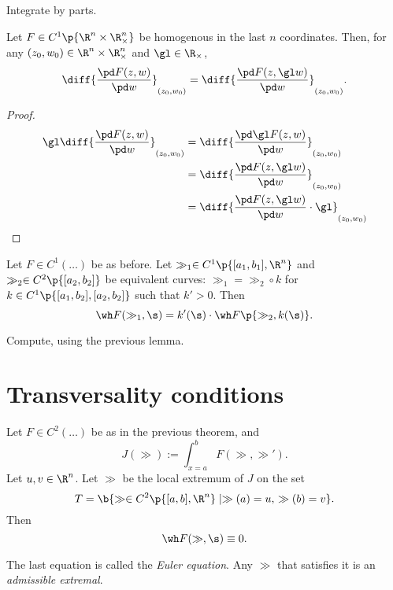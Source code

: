 \begin{idea}
  Integrate by parts.
\end{idea}

\begin{lemma}
  Let $F \in C^1 \p{\R^n \times \R^n_\times}$ be homogenous in the last $n$ coordinates.
  Then, for any $(z_0, w_0) \in \R^n \times \R^n_\times$ and $\gl \in \R_\times$,
  \begin{align*}
    \diff{\frac{\pd F(z, w)}{\pd w}}_{(z_0, w_0)} = \diff{\frac{\pd F(z, \gl w)}{\pd w}}_{(z_0, w_0)}.
  \end{align*} 
\end{lemma}

\begin{proof}
  \begin{align*}
    \gl \diff{\frac{\pd F(z, w)}{\pd w}}_{(z_0, w_0)}
    &= \diff{\frac{\pd \gl F(z, w)}{\pd w}}_{(z_0, w_0)} \\
    &= \diff{\frac{\pd F(z, \gl w)}{\pd w}}_{(z_0, w_0)} \\
    &= \diff{\frac{\pd F(z, \gl w)}{\pd w} \cdot \gl}_{(z_0, w_0)}
  \end{align*}
\end{proof}

\begin{lemma}
  Let $F \in C^1(\dots)$ be as before.
  Let $\gg_1 \in C^1\p{[a_1, b_1], \R^n}$ and $\gg_2 \in C^2\p{[a_2, b_2]}$ be equivalent curves: $\gg_1 = \gg_2 \circ k$ for $k \in C^1\p{[a_1, b_2], [a_2, b_2]}$ such that $k' > 0$.
  Then
  $$ \wh F(\gg_1, \s) = k'(\s) \cdot \wh F\p{\gg_2, k(\s)}. $$ 
\end{lemma}

\begin{idea}
  Compute, using the previous lemma.
\end{idea}

\section{Transversality conditions}

\begin{theorem}[Euler]
  Let $F \in C^2(\dots)$ be as in the previous theorem, and
  $$ J(\gg) := \int_{x=a}^b F(\gg, \gg'). $$
  Let $u, v \in \R^n$.
  Let $\gg$ be the local extremum of $J$ on the set
  $$ T = \b{\gg \in C^2\p{[a, b], \R^n} \mid \gg(a) = u,\, \gg(b) = v }. $$
  Then
  $$ \wh F(\gg, \s) \equiv 0. $$
\end{theorem}

\begin{definition}
  The last equation is called the \emph{Euler equation}.
  Any $\gg$ that satisfies it is an \emph{admissible extremal}.
\end{definition}


